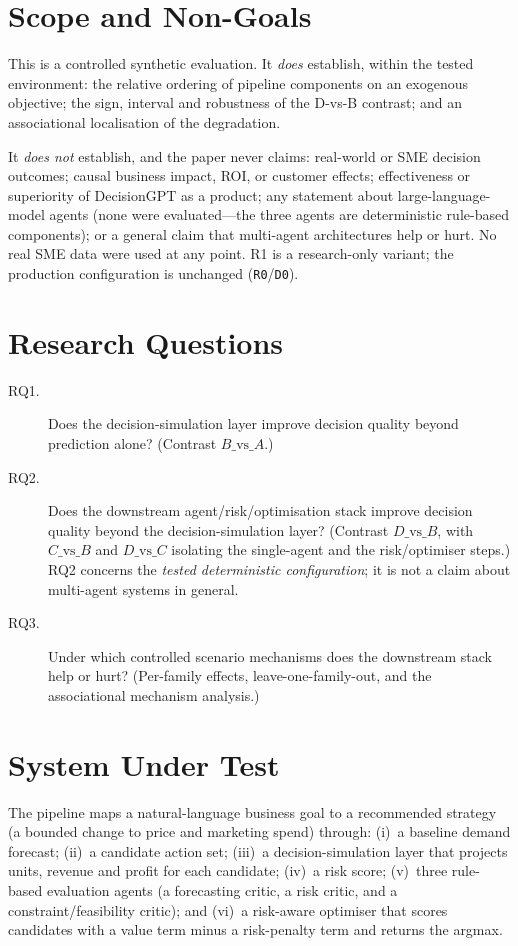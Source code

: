 \documentclass[conference]{IEEEtran}
\newcommand{\code}[1]{\texttt{#1}}
\begin{document}
\section{Scope and Non-Goals}\label{sec:scope}
This is a controlled synthetic evaluation. It \emph{does} establish, within the
tested environment: the relative ordering of pipeline components on an exogenous
objective; the sign, interval and robustness of the D-vs-B contrast; and an
associational localisation of the degradation.

It \emph{does not} establish, and the paper never claims: real-world or SME
decision outcomes; causal business impact, ROI, or customer effects;
effectiveness or superiority of DecisionGPT as a product; any statement about
large-language-model agents (none were evaluated---the three agents are
deterministic rule-based components); or a general claim that multi-agent
architectures help or hurt. No real SME data were used at any point. R1 is a
research-only variant; the production configuration is unchanged
(\code{R0}/\code{D0}).

\section{Research Questions}\label{sec:rq}
\begin{description}
  \item[RQ1.] Does the decision-simulation layer improve decision quality beyond
        prediction alone? (Contrast $B\text{\_vs\_}A$.)
  \item[RQ2.] Does the downstream agent/risk/optimisation stack improve decision
        quality beyond the decision-simulation layer? (Contrast $D\text{\_vs\_}B$,
        with $C\text{\_vs\_}B$ and $D\text{\_vs\_}C$ isolating the single-agent
        and the risk/optimiser steps.) RQ2 concerns the \emph{tested
        deterministic configuration}; it is not a claim about multi-agent systems
        in general.
  \item[RQ3.] Under which controlled scenario mechanisms does the downstream
        stack help or hurt? (Per-family effects, leave-one-family-out, and the
        associational mechanism analysis.)
\end{description}

\section{System Under Test}\label{sec:sut}
The pipeline maps a natural-language business goal to a recommended strategy
(a bounded change to price and marketing spend) through: (i)~a baseline demand
forecast; (ii)~a candidate action set; (iii)~a decision-simulation layer that
projects units, revenue and profit for each candidate; (iv)~a risk score;
(v)~three rule-based evaluation agents (a forecasting critic, a risk critic, and
a constraint/feasibility critic); and (vi)~a risk-aware optimiser that scores
candidates with a value term minus a risk-penalty term and returns the argmax.
\end{document}
